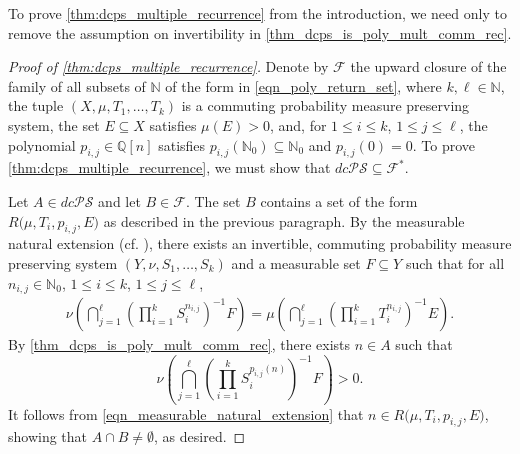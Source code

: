 \documentclass[letter,11pt]{article}
\theoremstyle{plain}
\theoremstyle{definition}
\theoremstyle{plain}
\theoremstyle{plain}
\numberwithin{equation}{section}
\newcommand{\N}{\mathbb{N}}
\newcommand{\Q}{\mathbb{Q}}
\renewcommand{\leq}{\leqslant}
\newcommand{\dcPS}{dc\mathcal{PS}}
\newcommand{\filter}{\mathscr{F}}
\newcommand{\family}{\mathscr{F}}
\newcommand{\polyret}{R}
\begin{document}
To prove \cref{thm:dcps_multiple_recurrence} from the introduction, we need only to remove the assumption on invertibility in \cref{thm_dcps_is_poly_mult_comm_rec}.

\begin{proof}[Proof of \cref{thm:dcps_multiple_recurrence}]
    Denote by $\filter$ the upward closure of the family of all subsets of $\N$ of the form in \eqref{eqn_poly_return_set}, where $k, \ell \in \N$, the tuple $(X, \mu, T_1, \ldots, T_k)$ is a commuting probability measure preserving system, the set $E \subseteq X$ satisfies $\mu(E) > 0$, and, for $1 \leq i \leq k$, $1 \leq j \leq \ell$, the polynomial $p_{i, j} \in \Q[n]$ satisfies $p_{i,j}(\N_0) \subseteq \N_0$ and $p_{i,j}(0) = 0$. To prove \cref{thm:dcps_multiple_recurrence}, we must show that $\dcPS \subseteq \family^*$.
    
    Let $A \in \dcPS$ and let $B \in \family$.  The set $B$ contains a set of the form $\polyret \big(\mu, T_i, p_{i,j}, E \big)$ as described in the previous paragraph.  By the measurable natural extension (cf. \cite[Lemma 7.11]{Bergelson-McCutcheon-IPpolynomialSzemeredi}), there exists an invertible, commuting probability measure preserving system $(Y, \nu, S_1, \ldots, S_k)$ and a measurable set $F \subseteq Y$ such that for all $n_{i, j} \in \N_0$, $1 \leq i \leq k$, $1 \leq j \leq \ell$,
    \begin{align}
        \label{eqn_measurable_natural_extension}
        \nu \left( \bigcap_{j=1}^\ell \left( \prod_{i=1}^{k} S_i^{n_{i,j}} \right)^{-1} F \right) = \mu \left( \bigcap_{j=1}^\ell \left( \prod_{i=1}^{k} T_i^{n_{i,j}} \right)^{-1} E \right).
    \end{align}
    By \cref{thm_dcps_is_poly_mult_comm_rec}, there exists $n \in A$ such that
    \[\nu\left( \bigcap_{j=1}^{\ell} \left( \prod_{i=1}^{k} S_i^{p_{i,j}(n)} \right)^{-1} F \right) > 0.\]
    It follows from \eqref{eqn_measurable_natural_extension} that $n \in \polyret \big(\mu, T_i, p_{i,j}, E \big)$, showing that $A \cap B \neq \emptyset$, as desired.
\end{proof}
\end{document}
